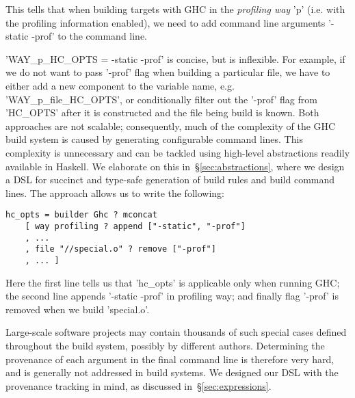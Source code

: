 This tells that when building targets with GHC in the \emph{profiling way}
\lst'p' (i.e. with the profiling information enabled), we need to add command
line arguments \lst'-static -prof' to the command line. 

\lst'WAY_p_HC_OPTS = -static -prof' is concise, but is inflexible. For example,
if we do not want to pass \lst'-prof' flag when building a particular file, we
have to either add a new component to the variable name, e.g.
\lst'WAY_p_file_HC_OPTS', or conditionally filter out the \lst'-prof' flag from
\lst'HC_OPTS' after it is constructed and the file being build is known. Both
approaches are not scalable; consequently, much of the complexity of the GHC
build system is caused by generating configurable command lines. This complexity is
unnecessary and can be tackled using high-level abstractions readily available
in Haskell. We elaborate on this in~\S\ref{sec:abstractions}, where we design a
DSL for succinct and type-safe generation of build rules and build command
lines. The approach allows us to write the following:

\begin{lstlisting}
hc_opts = builder Ghc ? mconcat
    [ way profiling ? append ["-static", "-prof"]
    , ...
    , file "//special.o" ? remove ["-prof"]
    , ... ]
\end{lstlisting}

\noindent Here the first line tells us that \lst'hc_opts' is applicable only
when running GHC; the second line appends \lst'-static -prof' in profiling way; and
finally flag \lst'-prof' is removed when we build \lst'special.o'. 

Large-scale software projects may contain thousands of such special cases
defined throughout the build system, possibly by different authors. Determining
the provenance of each argument in the final command line is therefore very
hard, and is generally not addressed in build systems. We designed our DSL with
the provenance tracking in mind, as discussed in~\S\ref{sec:expressions}.



